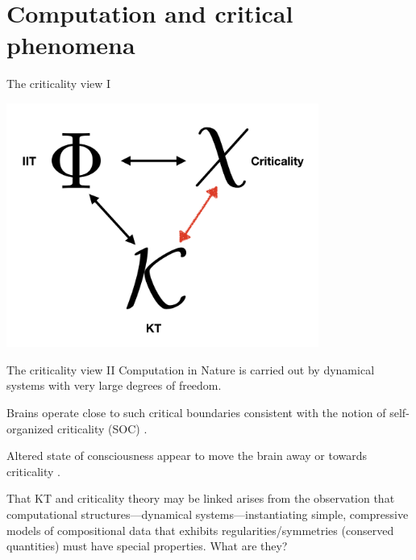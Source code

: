 \section{Computation and critical phenomena}



\begin{frame}[label=ladila]{The criticality view I}
 \begin{center}
  \includegraphics[height=8cm]{img/KUF.png}
  \end{center}
\end{frame}


\begin{frame}[label=ladila]{The criticality view II}
 Computation  in Nature is carried out by dynamical systems with very large degrees of freedom.  \vfill
 
  Brains operate close to such critical boundaries consistent with the notion of self-organized criticality (SOC) \citep{Bak1988,Chialvo:2004aa,Cocchi2017,Carhart2018,Deco2021}. \vfill
  
  Altered state of consciousness appear to move the brain away or towards criticality \citep{CarhartHarris2019,Ruffini:2022ac}.  \vfill
  
  That KT and criticality theory  may be linked arises from the observation that  computational structures---dynamical systems---instantiating simple, compressive models of compositional data that exhibits regularities/symmetries (conserved quantities) must have special properties.  What are they?\vfill
 
  \end{frame}
  
